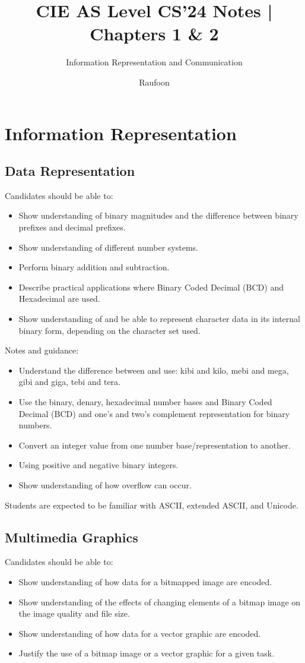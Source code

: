 \documentclass[a4paper]{article}
\title{CIE AS Level CS'24 Notes | Chapters 1 \& 2}
\author{Information Representation and Communication}
\date{Raufoon}
\begin{document}
\maketitle
\section{Information Representation}
\subsection{Data Representation}
Candidates should be able to:
\begin{itemize}
  \item Show understanding of binary magnitudes and the difference between binary prefixes and decimal prefixes.
  \item Show understanding of different number systems.
  \item Perform binary addition and subtraction.
  \item Describe practical applications where Binary Coded Decimal (BCD) and Hexadecimal are used.
  \item Show understanding of and be able to represent character data in its internal binary form, depending on the character set used.
\end{itemize}

Notes and guidance:
\begin{itemize}
  \item Understand the difference between and use: kibi and kilo, mebi and mega, gibi and giga, tebi and tera.
  \item Use the binary, denary, hexadecimal number bases and Binary Coded Decimal (BCD) and one's and two's complement representation for binary numbers.
  \item Convert an integer value from one number base/representation to another.
  \item Using positive and negative binary integers.
  \item Show understanding of how overflow can occur.
\end{itemize}

Students are expected to be familiar with ASCII, extended ASCII, and Unicode.

\subsection{Multimedia Graphics}
Candidates should be able to:
\begin{itemize}
  \item Show understanding of how data for a bitmapped image are encoded.
  \item Show understanding of the effects of changing elements of a bitmap image on the image quality and file size.
  \item Show understanding of how data for a vector graphic are encoded.
  \item Justify the use of a bitmap image or a vector graphic for a given task.
\end{itemize}
\end{document}
